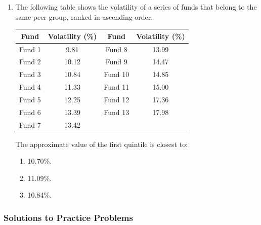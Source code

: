 \begin{enumerate}
	\item The following table shows the volatility of a series of funds that belong to the same peer group, ranked in ascending order:
	      \begin{center}
	      \begin{tabular}{|c|c||c|c|}
		      \hline
		      \textbf{Fund} & \textbf{Volatility (\%)} & \textbf{Fund} & \textbf{Volatility (\%)} \\
		      \hline
		      Fund 1 & 9.81 & Fund 8 & 13.99 \\
		      Fund 2 & 10.12 & Fund 9 & 14.47 \\
		      Fund 3 & 10.84 & Fund 10 & 14.85 \\
		      Fund 4 & 11.33 & Fund 11 & 15.00 \\
		      Fund 5 & 12.25 & Fund 12 & 17.36 \\
		      Fund 6 & 13.39 & Fund 13 & 17.98 \\
		      Fund 7 & 13.42 & & \\
		      \hline
	      \end{tabular}
	      \end{center}
	      The approximate value of the first quintile is closest to:
	      \begin{enumerate}[label=\Alph*.]
		      \item 10.70\%.
		      \item 11.09\%.
		      \item 10.84\%.
	      \end{enumerate}
\end{enumerate}

\subsubsection{Solutions to Practice Problems}
\label{subsec:app_Solutions_M5}

